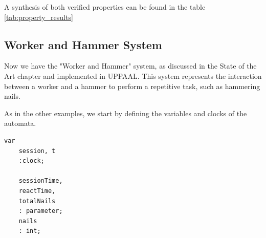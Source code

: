 A synthesis of both verified properties can be found in the table \ref{tab:property_results}

\begin{table}[h!]
\centering
{}
\caption{Synthesis of properties and corresponding results.}
\label{tab:property_results}
\end{table}


\subsection{Worker and Hammer System}

Now we have the "Worker and Hammer" system, as discussed in the State of the Art chapter and implemented in UPPAAL. This system represents the interaction between a worker and a hammer to perform a repetitive task, such as hammering nails.

As in the other examples, we start by defining the variables and clocks of the automata.

\begin{lstlisting}[language=UPPAAL]
    var
    session, t
    :clock;
    
    sessionTime,
    reactTime,
    totalNails
    : parameter;
    nails
    : int;	
\end{lstlisting}


